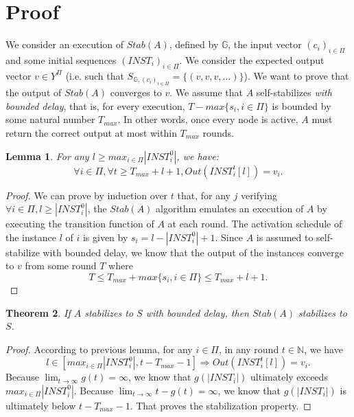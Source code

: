 \documentclass[11pt,letterpaper]{article}
\newtheorem{thm}{Theorem}
\newtheorem{lem}[thm]{Lemma}
\begin{document}
\section{Proof}

We consider an execution of $Stab(A)$, defined by $\mathds{G}$, the input vector $(c_i)_{i \in \Pi}$ and some initial sequences $(INST_i)_{i \in \Pi}$.
We consider the expected output vector $v \in Y^\Pi$ (i.e. such that $S_{\mathds{G}, (c_i)_{i \in \Pi}} = \{(v, v, v, \dots)\}$).
We want to prove that the output of $Stab(A)$ converges to $v$.
We assume that $A$ self-stabilizes \textit{with bounded delay}, that is, for every execution,
$T-max\{s_i, i \in \Pi\}$ is bounded by some natural number $T_{max}$.
In other words, once every node is active, $A$ must return the correct output at most within $T_{max}$ rounds.

\begin{lem}
	For any $l \geq max_{i \in \Pi} |INST_i^0|$, we have:
	$$\forall i \in \Pi, \forall t \geq T_{max}+l+1, Out(INST_i^t[l]) = v_i.$$
\end{lem}
\begin{proof}
	We can prove by induction over $t$ that, for any $j$ verifying $\forall i \in \Pi, l \geq |INST_i^0|$,
	the $Stab(A)$ algorithm emulates an execution of $A$ by executing the transition function of $A$ at each round.
	The activation schedule of the instance $l$ of $i$ is given by $s_i = l-|INST_i^0|+1$.
	Since $A$ is assumed to self-stabilize with bounded delay, we know that the output of the instances converge to $v$ from some round $T$ where
	$$T \leq T_{max} + max\{s_i, i \in \Pi\} \leq T_{max} + l + 1.$$
\end{proof}

\begin{thm}
	If $A$ stabilizes to $S$ with bounded delay, then $Stab(A)$ stabilizes to $S$.
\end{thm}
\begin{proof}
	According to previous lemma, for any $i \in \Pi$, in any round $t \in \mathds{N}$, we have
	$$l \in [max_{i \in \Pi} |INST_i^0|, t-T_{max}-1] \Rightarrow Out(INST_i^t[l]) = v_i.$$
	Because $\lim_{t \rightarrow \infty} g(t) = \infty$, we know that $g(|INST_i|)$ ultimately exceeds $max_{i \in \Pi} |INST_i^0|$.
	Because $\lim_{t \rightarrow \infty} t-g(t) = \infty$, we know that $g(|INST_i|)$ is ultimately below $t-T_{max}-1$.
	That proves the stabilization property.
\end{proof}
\end{document}
